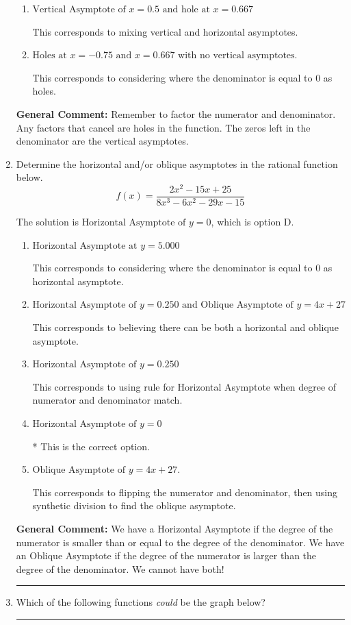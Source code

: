 \documentclass{extbook}[14pt]
\newcommand{\litem}[1]{\item #1

\rule{\textwidth}{0.4pt}}
\begin{document}
\begin{enumerate}
{\begin{enumerate}[label=\Alph*.]
This corresponds to not factoring out the hole.
\item \( \text{Vertical Asymptote of } x = 0.5 \text{ and hole at } x = 0.667 \)

This corresponds to mixing vertical and horizontal asymptotes.
\item \( \text{Holes at } x = -0.75 \text{ and } x = 0.667 \text{ with no vertical asymptotes.} \)

This corresponds to considering where the denominator is equal to 0 as holes.
\end{enumerate}

\textbf{General Comment:} Remember to factor the numerator and denominator. Any factors that cancel are holes in the function. The zeros left in the denominator are the vertical asymptotes.
}
\litem{
Determine the horizontal and/or oblique asymptotes in the rational function below.
\[ f(x) = \frac{2x^{2} -15 x + 25}{8x^{3} -6 x^{2} -29 x -15} \]

The solution is \( \text{Horizontal Asymptote of } y = 0 \), which is option D.\begin{enumerate}[label=\Alph*.]
\item \( \text{Horizontal Asymptote at } y = 5.000 \)

This corresponds to considering where the denominator is equal to 0 as horizontal asymptote.
\item \( \text{Horizontal Asymptote of } y = 0.250 \text{ and Oblique Asymptote of } y = 4x + 27 \)

This corresponds to believing there can be both a horizontal and oblique asymptote.
\item \( \text{Horizontal Asymptote of } y = 0.250  \)

This corresponds to using rule for Horizontal Asymptote when degree of numerator and denominator match.
\item \( \text{Horizontal Asymptote of } y = 0 \)

* This is the correct option.
\item \( \text{Oblique Asymptote of } y = 4x + 27. \)

This corresponds to flipping the numerator and denominator, then using synthetic division to find the oblique asymptote.
\end{enumerate}

\textbf{General Comment:} We have a Horizontal Asymptote if the degree of the numerator is smaller than or equal to the degree of the denominator. We have an Oblique Asymptote if the degree of the numerator is larger than the degree of the denominator. We cannot have both!
}
\litem{
Which of the following functions \textit{could} be the graph below?

}
\end{enumerate}
\end{document}
